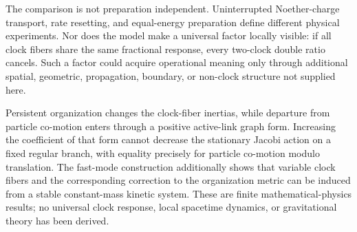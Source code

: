 \documentclass[11pt]{article}
\theoremstyle{plain}
\begin{document}
The comparison is not preparation independent. Uninterrupted Noether-charge transport, rate resetting, and equal-energy preparation define different physical experiments. Nor does the model make a universal factor locally visible: if all clock fibers share the same fractional response, every two-clock double ratio cancels. Such a factor could acquire operational meaning only through additional spatial, geometric, propagation, boundary, or non-clock structure not supplied here.

Persistent organization changes the clock-fiber inertias, while departure from
particle co-motion enters through a positive active-link graph form.  Increasing
the coefficient of that form cannot decrease the stationary Jacobi action on
a fixed regular branch, with equality precisely for particle co-motion modulo
translation.  The fast-mode construction additionally shows that variable
clock fibers and the corresponding correction to the organization metric can
be induced from a stable constant-mass kinetic system.  These are finite
mathematical-physics results; no universal clock response, local spacetime
dynamics, or gravitational theory has been derived.
\end{document}
